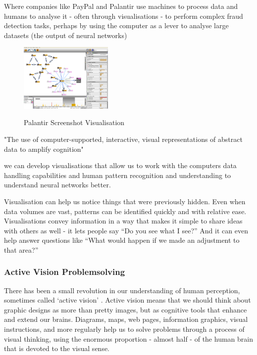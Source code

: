 \documentclass[a4paper,11pt,titlepage]{article}
\begin{document}
Where companies like PayPal and Palantir use machines to process data and humans to analyse it - often through visualisations - to perform complex fraud detection tasks, perhaps by using the computer as a lever to analyse large datasets (the output of neural networks) 


		\begin{figure}[H]
    			\centering	
			{{\includegraphics[width=0.4\textwidth]
    				{img/palantir_01.png} 
    			}}%
    			\caption{Palantir Screenshot Visualisation}%
    		\label{fig:Palantir}
		\end{figure}


"The use of computer-supported, interactive, visual representations of abstract data to amplify cognition" \cite{card1999}

we can develop visualisations that allow us to work with the computers data handling capabilities and human pattern recognition and understanding to understand neural networks better. 

Visualisation can help us notice things that were previously hidden. Even when data volumes are vast, patterns can be identified quickly and with relative ease. Visualisations convey information in a way that makes it simple to share ideas with others as well -  it lets people say ``Do you see what I see?” And it can even help answer questions like ``What would happen if we made an adjustment to that area?”


\subsubsection{Active Vision Problemsolving}
		
 		There has been a small revolution in our understanding of human perception, sometimes called `active vision' \cite{Ware2010}. Active vision means that we should think about graphic designs as more than pretty images, but as cognitive tools that enhance and extend our brains. Diagrams, maps, web pages, information graphics, visual instructions, and more regularly help us to solve problems through a process of visual thinking, using the enormous proportion - almost half - of the human brain that is devoted to the visual sense.  
 		
\end{document}
